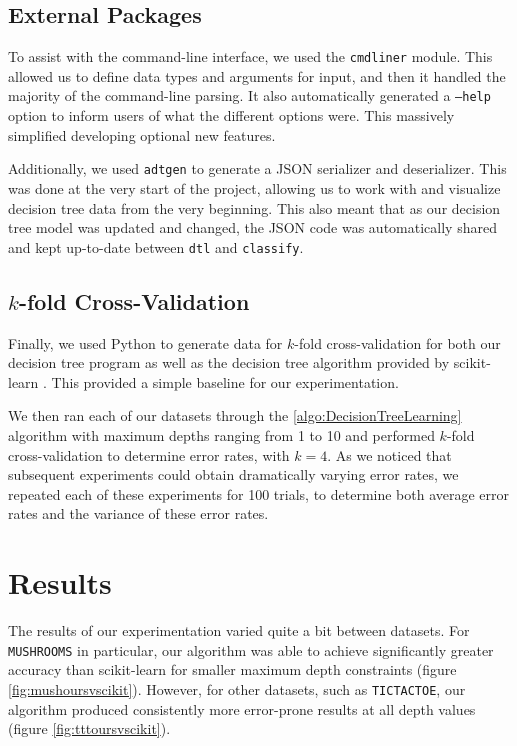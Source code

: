 \documentclass[screen, authorversion, nonacm, sigconf]{acmart}
\begin{document}
\subsection{External Packages}

To assist with the command-line interface, we used the \texttt{cmdliner} module. This allowed us to define data types and arguments for input, and then it handled the majority of the command-line parsing. It also automatically generated a \texttt{--help} option to inform users of what the different options were. This massively simplified developing optional new features.

Additionally, we used \texttt{adtgen} to generate a JSON serializer and deserializer. This was done at the very start of the project, allowing us to work with and visualize decision tree data from the very beginning. This also meant that as our decision tree model was updated and changed, the JSON code was automatically shared and kept up-to-date between \texttt{dtl} and \texttt{classify}.

\subsection{$k$-fold Cross-Validation}

Finally, we used Python to generate data for $k$-fold cross-validation for both our decision tree program as well as the decision tree algorithm provided by scikit-learn \cite{scikit-learn}. This provided a simple baseline for our experimentation.

We then ran each of our datasets through the \ref{algo:DecisionTreeLearning} algorithm with maximum depths ranging from 1 to 10 and performed $k$-fold cross-validation to determine error rates, with $k = 4$. As we noticed that subsequent experiments could obtain dramatically varying error rates, we repeated each of these experiments for 100 trials, to determine both average error rates and the variance of these error rates.

\section{Results}

The results of our experimentation varied quite a bit between datasets. For \texttt{MUSHROOMS} in particular, our algorithm was able to achieve significantly greater accuracy than scikit-learn for smaller maximum depth constraints (figure \ref{fig:mushoursvscikit}). However, for other datasets, such as \texttt{TICTACTOE}, our algorithm produced consistently more error-prone results at all depth values (figure \ref{fig:tttoursvscikit}).
\end{document}

